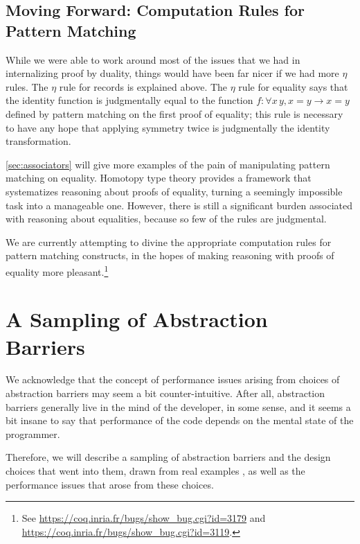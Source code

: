   \subsection{Moving Forward: Computation Rules for Pattern Matching} \label{sec:compute-match}
    While we were able to work around most of the issues that we had in internalizing proof by duality, things would have been far nicer if we had more $\eta$ rules.
    The $\eta$ rule for records is explained above.
    The $\eta$ rule for equality says that the identity function is judgmentally equal to the function $f : \forall x\, y, x = y \to x = y$ defined by pattern matching on the first proof of equality; this rule is necessary to have any hope that applying symmetry twice is judgmentally the identity transformation.

    \autoref{sec:associators} will give more examples of the pain of manipulating pattern matching on equality.
    Homotopy type theory provides a framework that systematizes reasoning about proofs of equality, turning a seemingly impossible task into a manageable one.
    However, there is still a significant burden associated with reasoning about equalities, because so few of the rules are judgmental.

    We are currently attempting to divine the appropriate computation rules for pattern matching constructs, in the hopes of making reasoning with proofs of equality more pleasant.\footnote{See \url{https://coq.inria.fr/bugs/show\_bug.cgi?id=3179} and \url{https://coq.inria.fr/bugs/show\_bug.cgi?id=3119}.}

\section{A Sampling of Abstraction Barriers}

We acknowledge that the concept of performance issues arising from choices of abstraction barriers may seem a bit counter-intuitive.
After all, abstraction barriers generally live in the mind of the developer, in some sense, and it seems a bit insane to say that performance of the code depends on the mental state of the programmer.

Therefore, we will describe a sampling of abstraction barriers and the design choices that went into them, drawn from real examples , as well as the performance issues that arose from these choices.

